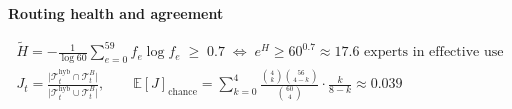 \documentclass[border=40pt]{standalone}
\begin{document}
\begin{minipage}{26cm}
{\sffamily\bfseries\Large\color{muted} Routing health and agreement}\par\vspace{-14pt}
{\LARGE
\begin{gather*}
\tilde H = -\frac{1}{\log 60}\sum_{e=0}^{59} f_e \log f_e \;\ge\; 0.7 \;\iff\; e^{H} \ge 60^{0.7} \approx 17.6 \text{ experts in effective use}
\\[6pt]
J_t = \frac{\lvert \mathcal{T}^{\mathrm{hyb}}_t \cap \mathcal{T}^{B}_t\rvert}{\lvert \mathcal{T}^{\mathrm{hyb}}_t \cup \mathcal{T}^{B}_t\rvert},
\qquad \mathbb{E}[J]_{\text{chance}} = \sum_{k=0}^{4} \frac{\binom{4}{k}\binom{56}{4-k}}{\binom{60}{4}}\cdot\frac{k}{8-k} \approx 0.039
\end{gather*}}
\end{minipage}
\end{document}
